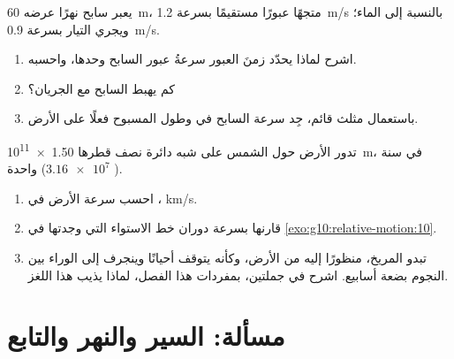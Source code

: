 \begin{exercise}[$\star\star\star$]\label{exo:g10:relative-motion:14}
يعبر سابح نهرًا عرضه \qty{60}{m}، متجهًا عبورًا مستقيمًا بسرعة
\qty{1.2}{m/s} بالنسبة إلى الماء؛ ويجري التيار بسرعة
\qty{0.9}{m/s}.
\begin{enumerate}
  \item اشرح لماذا يحدّد زمنَ العبور سرعةُ عبور السابح
        وحدها، واحسبه.
  \item كم يهبط السابح مع الجريان؟
  \item باستعمال مثلث قائم، جِد سرعة السابح في  وطول  المسبوح فعلًا على الأرض.
\end{enumerate}
\end{exercise}

\begin{exercise}[$\star\star\star$]\label{exo:g10:relative-motion:15}
تدور الأرض حول الشمس على شبه دائرة نصف قطرها
\qty{1.50e11}{m}، في سنة واحدة ($\num{3.16e7}$ ).
\begin{enumerate}
  \item احسب سرعة الأرض في ، 
        \unit{km/s}.
  \item قارنها بسرعة دوران خط الاستواء التي وجدتها في
        \cref{exo:g10:relative-motion:10}.
  \item تبدو المريخ، منظورًا إليه من الأرض، وكأنه يتوقف أحيانًا وينجرف
        إلى الوراء بين النجوم بضعة أسابيع. اشرح في جملتين،
        بمفردات هذا الفصل، لماذا يذيب  هذا اللغز.
\end{enumerate}
\end{exercise}

\section{مسألة: السير والنهر والتابع}

